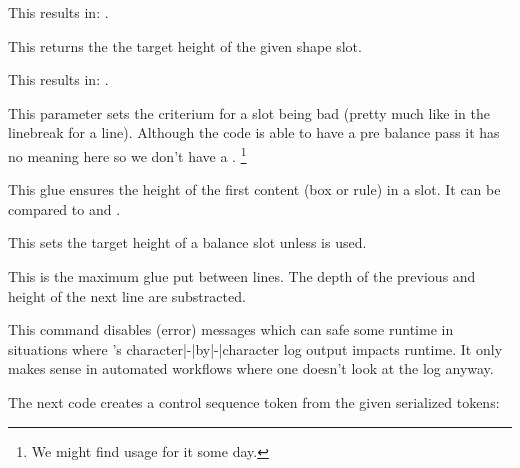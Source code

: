 \start \getbuffer[shape] This results in: {\inlinebuffer}. \stop

\stopnewprimitive

\startnewprimitive[title={\prm {balanceshapevsize}}]

This returns the the target height of the given shape slot.

\startbuffer
\the{} \space
\the{}
\stopbuffer

\typebuffer

\start \getbuffer[shape] This results in: {\inlinebuffer}. \stop

\stopnewprimitive

\startnewprimitive[title={\prm {balancetolerance}}]

This parameter sets the criterium for a slot being bad (pretty much like in the
linebreak for a line). Although the code is able to have a pre balance pass it
has no meaning here so we don't have a \type {\balancepretolerance}. \footnote
{We might find usage for it some day.}

\stopnewprimitive

\startnewprimitive[title={\prm {balancetopskip}}]

This glue ensures the height of the first content (box or rule) in a slot. It can
be compared to  and .

\stopnewprimitive

\startnewprimitive[title={\prm {balancevsize}}]

This sets the target height of a balance slot unless  is used.

\stopnewprimitive

\startoldprimitive[title={\prm {baselineskip}}]

This is the maximum glue put between lines. The depth of the previous and height
of the next line are substracted.

\stopoldprimitive

\startoldprimitive[title={\prm {batchmode}}]

This command disables (error) messages which can safe some runtime in situations
where \TEX's character|-|by|-|character log output impacts runtime. It only makes
sense in automated workflows where one doesn't look at the log anyway.

\stopoldprimitive

\startnewprimitive[title={\prm {begincsname}}]

The next code creates a control sequence token from the given serialized tokens:

